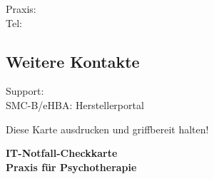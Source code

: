   Praxis: \PraxisInhaberin\\
  Tel: \PraxisTelefon

  \subsection*{Weitere Kontakte}
  \PVSName{} Support: \PVSSupportTel\\
  SMC-B/eHBA: Herstellerportal

  Diese Karte ausdrucken und griffbereit halten!
\else
  \begin{center}
    \textbf{\Large IT-Notfall-Checkkarte}\\
    \textbf{Praxis für Psychotherapie \PraxisInhaberin}
  \end{center}

